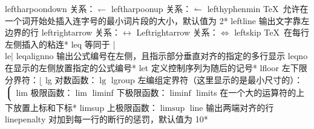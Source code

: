 \capcs leftharpoondown {关系：$\leftharpoondown$}{}{}
\capcs leftharpoonup {关系：$\leftharpoonup$}{}{}
\capcs lefthyphenmin {\TeX\ 允许在一个词开始处插入连字号的最小词片段的大小，默认值为 2}*{}
\capcs leftline {输出文字靠左边界的行}{}{}
\capcs leftrightarrow {关系：$\leftrightarrow$}{}{}
\capcs Leftrightarrow {关系：$\Leftrightarrow$}{}{}
\capcs leftskip {\TeX\ 在每行左侧插入的粘连}*{}
\capcs leq {等同于 |\\le|}{}{}
\capcs leqalignno {输出公式编号在左侧，且指示部分垂直对齐的指定的多行显示}{}{}
\capcs leqno {在显示的左侧放置指定的公式编号}*{}
\capcs let {定义控制序列为随后的记号}*{}
\capcs lfloor {左下限分界符：$\lfloor$}{}{}
\capcs lg {对数函数：$\lg$}{}{}
\capcs lgroup {左编组定界符（这里显示的是最小尺寸的）：$\Big\lgroup$}{}{}
\capcs lim {极限函数：$\lim$}{}{}
\capcs liminf {下极限函数：$\liminf$}{}{}
\capcs limits {在一个大的运算符的上下放置上标和下标}*{}
\capcs limsup {上极限函数：$\limsup$}{}{}
\capcs line {输出两端对齐的行}{}{}
\capcs linepenalty {对加到每一行的断行的惩罚，默认值为 10}*{}
